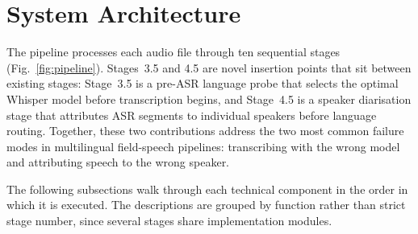 \documentclass[12pt, onecolumn]{IEEEtran}
\begin{document}
\section{System Architecture}
\label{sec:system}

The pipeline processes each audio file through ten sequential stages (Fig.~\ref{fig:pipeline}). Stages~3.5 and 4.5 are novel insertion points that sit between existing stages: Stage~3.5 is a pre-ASR language probe that selects the optimal Whisper model before transcription begins, and Stage~4.5 is a speaker diarisation stage that attributes ASR segments to individual speakers before language routing. Together, these two contributions address the two most common failure modes in multilingual field-speech pipelines: transcribing with the wrong model and attributing speech to the wrong speaker.

The following subsections walk through each technical component in the order in which it is executed. The descriptions are grouped by function rather than strict stage number, since several stages share implementation modules.
\end{document}
